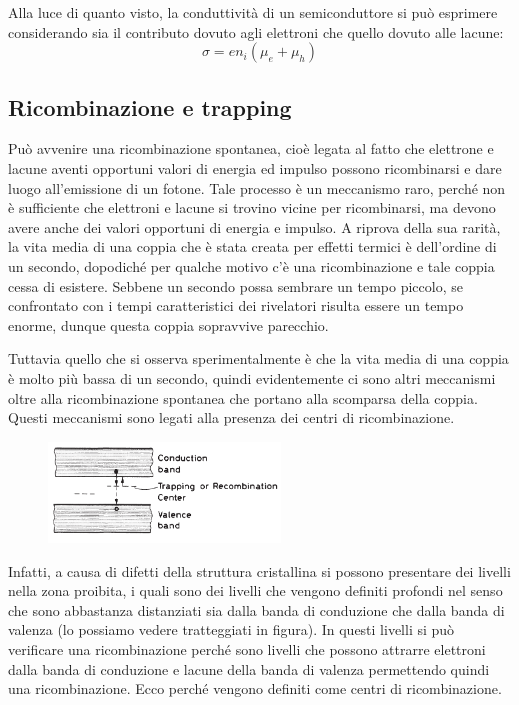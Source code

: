 Alla luce di quanto visto, la conduttività di un semiconduttore si può esprimere considerando sia il contributo dovuto agli elettroni che quello dovuto alle lacune:
\begin{equation*}
   \sigma=e n_i (\mu_e + \mu_h)
\end{equation*}
\subsection{Ricombinazione e trapping}

Può avvenire una ricombinazione spontanea, cioè legata al fatto che elettrone e lacune aventi opportuni valori di energia ed impulso possono ricombinarsi e dare luogo all'emissione di un fotone. Tale processo è un meccanismo raro, perché non è sufficiente che elettroni e lacune si trovino vicine per ricombinarsi, ma devono avere anche dei valori opportuni di energia e impulso. A riprova della sua rarità, la vita media di una coppia che è stata creata per effetti termici è dell'ordine di un secondo, dopodiché per qualche motivo c'è una ricombinazione e tale coppia cessa di esistere. Sebbene un secondo possa sembrare un tempo piccolo, se confrontato con i tempi caratteristici dei rivelatori risulta essere un tempo enorme, dunque questa coppia sopravvive parecchio.

Tuttavia quello che si osserva sperimentalmente è che la vita media di una coppia è molto più bassa di un secondo, quindi evidentemente ci sono altri meccanismi oltre alla ricombinazione spontanea che portano alla scomparsa della coppia. Questi meccanismi sono legati alla presenza dei centri di ricombinazione.

\begin{figure}[H]
   \centering
   \includegraphics[width=0.55\textwidth]{immagini/centri_di_ricombinazione.png}
\end{figure}

Infatti, a causa di difetti della struttura cristallina si possono presentare dei livelli nella zona proibita, i quali sono dei livelli che vengono definiti profondi nel senso che sono abbastanza distanziati sia dalla banda di conduzione che dalla banda di valenza (lo possiamo vedere tratteggiati in figura). In questi livelli si può verificare una ricombinazione perché sono livelli che possono attrarre elettroni dalla banda di conduzione e lacune della banda di valenza permettendo quindi una ricombinazione. Ecco perché vengono definiti come centri di ricombinazione.


